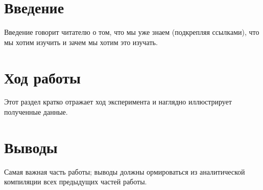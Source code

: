 

\newcommand{\artitle}{Изучение плазмы газового\\[9pt] разряда в неоне}

\newcommand{\arabstract}{Аннотация должна кратко отражать содержание всей работы.}





\section*{Введение}
Введение говорит читателю о том, что мы уже знаем (подкрепляя ссылками), что мы хотим изучить и зачем мы хотим это изучать.

\section*{Ход работы}
Этот раздел кратко отражает ход эксперимента и наглядно иллюстрирует полученные данные.

\section*{Выводы}
Самая важная часть работы; выводы должны ормироваться из аналитической компиляции всех предыдущих частей работы.

